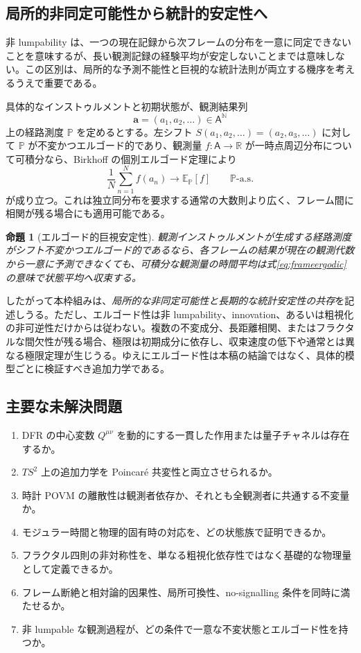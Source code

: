 \documentclass[a4paper,11pt]{ltjsarticle}
\newtheorem{proposition}[definition]{命題}
\theoremstyle{remark}
\newcommand{\R}{\mathbb{R}}
\begin{document}
\subsection{局所的非同定可能性から統計的安定性へ}
非 lumpability は、一つの現在記録から次フレームの分布を一意に同定できないことを意味するが、長い観測記録の経験平均が安定しないことまでは意味しない。この区別は、局所的な予測不能性と巨視的な統計法則が両立する機序を考えるうえで重要である。

具体的なインストゥルメントと初期状態が、観測結果列
\begin{equation}
 \bm a=(a_1,a_2,\ldots)\in\mathsf A^{\mathbb N}
\end{equation}
上の経路測度 $\mathbb P$ を定めるとする。左シフト $S(a_1,a_2,\ldots)=(a_2,a_3,\ldots)$ に対して $\mathbb P$ が不変かつエルゴード的であり、観測量 $f:\mathsf A\to\R$ が一時点周辺分布について可積分なら、Birkhoff の個別エルゴード定理により
\begin{equation}
 \frac{1}{N}\sum_{n=1}^{N}f(a_n)
 \longrightarrow
 \mathbb E_{\mathbb P}[f]
 \qquad\mathbb P\text{-a.s.}
 \label{eq:frameergodic}
\end{equation}
が成り立つ\cite{Birkhoff1931}。これは独立同分布を要求する通常の大数則より広く、フレーム間に相関が残る場合にも適用可能である。

\begin{proposition}[エルゴード的巨視安定性]
観測インストゥルメントが生成する経路測度がシフト不変かつエルゴード的であるなら、各フレームの結果が現在の観測代数から一意に予測できなくても、可積分な観測量の時間平均は式\eqref{eq:frameergodic}の意味で状態平均へ収束する。
\end{proposition}

したがって本枠組みは、\emph{局所的な非同定可能性と長期的な統計安定性の共存}を記述しうる。ただし、エルゴード性は非 lumpability、innovation、あるいは粗視化の非可逆性だけからは従わない。複数の不変成分、長距離相関、またはフラクタルな間欠性が残る場合、極限は初期成分に依存し、収束速度の低下や通常とは異なる極限定理が生じうる。ゆえにエルゴード性は本稿の結論ではなく、具体的模型ごとに検証すべき追加力学である。

\subsection{主要な未解決問題}
\begin{enumerate}
  \item DFR の中心変数 $Q^{\mu\nu}$ を動的にする一貫した作用または量子チャネルは存在するか。
  \item $TS^2$ 上の追加力学を Poincar\'e 共変性と両立させられるか。
  \item 時計 POVM の離散性は観測者依存か、それとも全観測者に共通する不変量か。
  \item モジュラー時間と物理的固有時の対応を、どの状態族で証明できるか。
  \item フラクタル四則の非対称性を、単なる粗視化依存性ではなく基礎的な物理量として定義できるか。
  \item フレーム断絶と相対論的因果性、局所可換性、no-signalling 条件を同時に満たせるか。
  \item 非 lumpable な観測過程が、どの条件で一意な不変状態とエルゴード性を持つか。
\end{enumerate}
\end{document}
